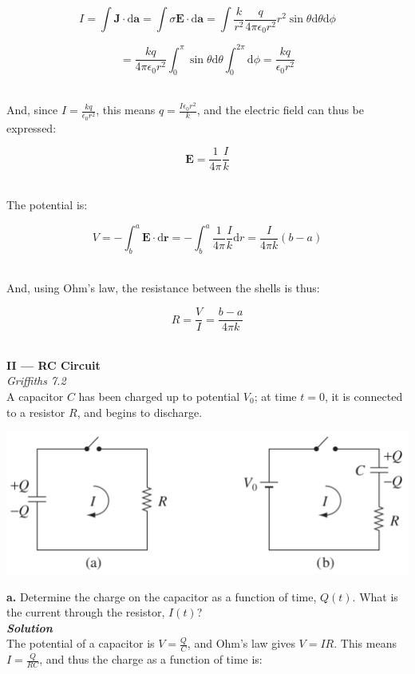 \documentclass[9pt]{extarticle}
\renewcommand{\v}[1]{{\bm #1}}
\newcommand{\bfit}[1]{\textbf{\textit{#1}}}
\renewcommand{\d}{\text{d}}
\newcommand{\eo}{\epsilon_0}
\begin{document}
\begin{multicols*}{2}
$$I = \int \v J \cdot \d \v a = \int \sigma \v E \cdot \d \v a = \int \frac{k}{r^2} \frac{q}{4\pi \eo r^2} r^2\sin\theta \d\theta \d\phi$$ 

$$= \frac{kq}{4\pi\eo r^2} \int_0^\pi \sin\theta \d\theta \int_0^{2\pi} \d\phi = \frac{kq}{\eo r^2}$$ \ 

And, since $I  = \frac{kq}{\eo r^2}$, this means $q = \frac{I\eo r^2}{k}$, and the electric field can thus be expressed:

$$\v E = \frac{1}{4\pi} \frac Ik$$ \ 

The potential is:

$$V = -\int_b^a \v E \cdot \d \v r = -\int_b^a  \frac{1}{4\pi} \frac Ik \d r = \frac{I}{4\pi k} (b-a)$$ \ 

And, using Ohm's law, the resistance between the shells is thus:

$$R = \frac VI = \frac{b-a}{4\pi k}$$ \ 






\hrulefill 

\hfill 

{\LARGE \bf II --- RC Circuit} \\ 

{\it Griffiths 7.2} \\ 

A capacitor $C$ has been charged up to potential $V_0$; at time $t=0$, it is connected to a resistor $R$, and begins to discharge. \\ 

\begin{center}
        \includegraphics[scale=0.5]{ps7-pic2.png}
\end{center}

{\Large \bf a.} Determine the charge on the capacitor as a function of time, $Q(t)$. What is the current through the resistor, $I(t)$? \\ 

{\bfit{Solution}} \\ 

The potential of a capacitor is $V = \frac QC$, and Ohm's law gives $V=IR$. This means $I = \frac{Q}{RC}$, and thus the charge as a function of time is:


\end{multicols*}
\end{document}
